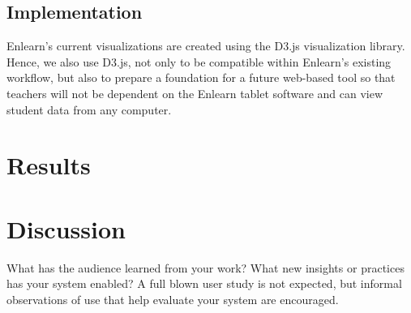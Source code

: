 \documentclass{sigchi}
\begin{document}
\subsection{Implementation}
Enlearn's current visualizations are created using the D3.js visualization library. Hence, we also use D3.js, not only to be compatible within Enlearn's existing workflow, but also to prepare a foundation for a future web-based tool so that teachers will not be dependent on the Enlearn tablet software and can view student data from any computer.

\section{Results}



\section{Discussion}
What has the audience learned from your work? What new insights or practices has your system enabled? A full blown user study is not expected, but informal observations of use that help evaluate your system are encouraged.
\end{document}
